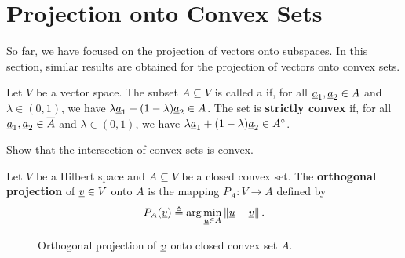 \section{Projection onto Convex Sets}

So far, we have focused on the projection of vectors onto subspaces.
In this section, similar results are obtained for the projection of vectors onto convex sets.

\begin{definition}
Let $V$ be a vector space.
The subset $A \subseteq V$ is called a  if, for all $\underline{a}_1,\underline{a}_2 \in A$ and $\lambda\in(0,1)$, we have $\lambda \underline{a}_1 + (1-\lambda) \underline{a}_2 \in A$.
The set is \textbf{strictly convex} if, for all $\underline{a}_1,\underline{a}_2 \in \overline{A}$ and $\lambda\in(0,1)$, we have $\lambda \underline{a}_1 + (1-\lambda) \underline{a}_2 \in {A}^{\circ}$.
\end{definition}

\begin{problem}
Show that the intersection of convex sets is convex.
\end{problem}

\begin{definition}
Let $V$ be a Hilbert space and $A\subseteq V$ be a closed convex set. The \textbf{orthogonal projection} of $\underline{v} \in V$ onto $A$ is the mapping $P_A \colon V \to A$ defined by
\[
P_A (\underline{v}) \triangleq \arg \min_{\underline u\in A}\left\Vert \underline u-\underline v\right\Vert. 
\]
\end{definition}

\begin{figure}
\centering
{}
\caption{Orthogonal projection of $\underline{v}$ onto closed convex set $A$. \label{fig:pocs}}
\end{figure}

